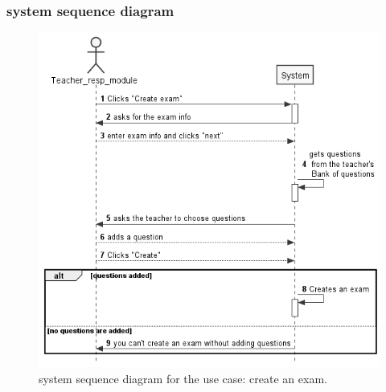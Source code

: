 \documentclass[]{uc2pfecaneva}
\begin{document}
\subsubsection{system sequence diagram}
\begin{figure}[h]
	
	\centering
	\includegraphics[width=\textwidth]{images/Create_Exam}
	
	\caption{system sequence diagram for the use case: create an exam.}
\end{figure}
\clearpage
\end{document}
